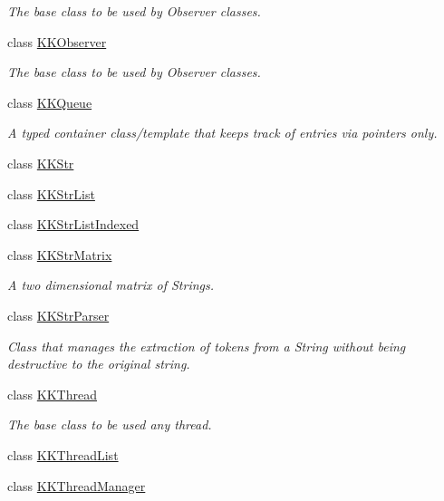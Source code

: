 \begin{DoxyCompactItemize}
\begin{DoxyCompactList}\small\item\em The base class to be used by Observer classes. \end{DoxyCompactList}\item 
class \hyperlink{class_k_k_b_1_1_k_k_observer}{K\+K\+Observer}
\begin{DoxyCompactList}\small\item\em The base class to be used by Observer classes. \end{DoxyCompactList}\item 
class \hyperlink{class_k_k_b_1_1_k_k_queue}{K\+K\+Queue}
\begin{DoxyCompactList}\small\item\em A typed container class/template that keeps track of entries via pointers only. \end{DoxyCompactList}\item 
class \hyperlink{class_k_k_b_1_1_k_k_str}{K\+K\+Str}
\item 
class \hyperlink{class_k_k_b_1_1_k_k_str_list}{K\+K\+Str\+List}
\item 
class \hyperlink{class_k_k_b_1_1_k_k_str_list_indexed}{K\+K\+Str\+List\+Indexed}
\item 
class \hyperlink{class_k_k_b_1_1_k_k_str_matrix}{K\+K\+Str\+Matrix}
\begin{DoxyCompactList}\small\item\em A two dimensional matrix of Strings. \end{DoxyCompactList}\item 
class \hyperlink{class_k_k_b_1_1_k_k_str_parser}{K\+K\+Str\+Parser}
\begin{DoxyCompactList}\small\item\em Class that manages the extraction of tokens from a String without being destructive to the original string. \end{DoxyCompactList}\item 
class \hyperlink{class_k_k_b_1_1_k_k_thread}{K\+K\+Thread}
\begin{DoxyCompactList}\small\item\em The base class to be used any thread. \end{DoxyCompactList}\item 
class \hyperlink{class_k_k_b_1_1_k_k_thread_list}{K\+K\+Thread\+List}
\item 
class \hyperlink{class_k_k_b_1_1_k_k_thread_manager}{K\+K\+Thread\+Manager}
\item 

\end{DoxyCompactItemize}

